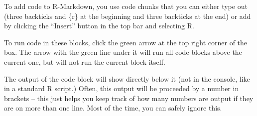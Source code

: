 \documentclass[
]{article}
\begin{document}
To add code to R-Markdown, you use code chunks that you can either type
out (three backticks and \{r\} at the beginning and three backticks at
the end) or add by clicking the ``Insert'' button in the top bar and
selecting R.

To run code in these blocks, click the green arrow at the top right
corner of the box. The arrow with the green line under it will run all
code blocks above the current one, but will not run the current block
itself.

The output of the code block will show directly below it (not in the
console, like in a standard R script.) Often, this output will be
proceeded by a number in brackets -- this just helps you keep track of
how many numbers are output if they are on more than one line. Most of
the time, you can safely ignore this.
\end{document}
